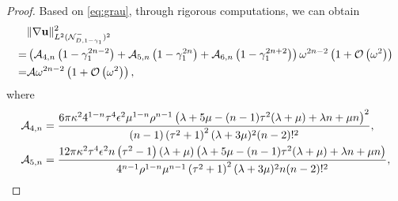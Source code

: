 \documentclass[11pt,reqno,twoside]{amsart}
\theoremstyle{definition}
\theoremstyle{remark}
\numberwithin{equation}{section}
\newcommand{\bu}{\mathbf{u}}
\newcommand{\bx}{\mathbf{x}}
\begin{document}
\begin{proof}
			Based on \eqref{eq:grau}, through rigorous computations, we can obtain
			\begin{align}
				&\|\nabla\bu\|_{L^{2}(\mathcal{N}_{D,1-\gamma_{1}}^{-})^2 }^{2} \label{eq:graufs}\\
				=&\left(\mathcal{A}_{4,n}\left(1-\gamma _{1}^{2n-2}\right)+\mathcal{A}_{5,n}\left(1-\gamma _{1}^{2n}\right)+\mathcal{A}_{6,n}\left(1-\gamma _{1}^{2n+2}\right)\right)\omega^{2n-2}\left(1+\mathcal{O}\left(\omega^2\right)\right)\notag\\
				=&\mathcal{A}\omega^{2n-2}\left(1+\mathcal{O}\left(\omega^2\right)\right),\notag		
			\end{align}
			where
			\begin{align}
				\mathcal{A}_{4,n}&=\frac{6\pi\kappa^2 4^{1-n} \tau ^4 \epsilon ^2 \mu ^{1-n} \rho ^{n-1}  \left(\lambda +5 \mu -(n-1) \tau ^2 (\lambda +\mu )+\lambda  n+\mu  n\right)^2}{(n-1)\left(\tau ^2+1\right)^2 (\lambda +3 \mu )^2  (n-2)!^2},\notag\\
				\mathcal{A}_{5,n}&=\frac{12\pi\kappa^2  \tau ^4 \epsilon ^2    n \left(\tau ^2-1\right) (\lambda +\mu ) \left(\lambda +5 \mu -(n-1) \tau ^2 (\lambda +\mu )+\lambda  n+\mu  n\right)}{4^{n-1}\rho ^{1-n}\mu ^{n-1}\left(\tau ^2+1\right)^2 (\lambda +3 \mu )^2 n (n-2)!^2},\notag\\

\end{align}
\end{proof}
\end{document}
